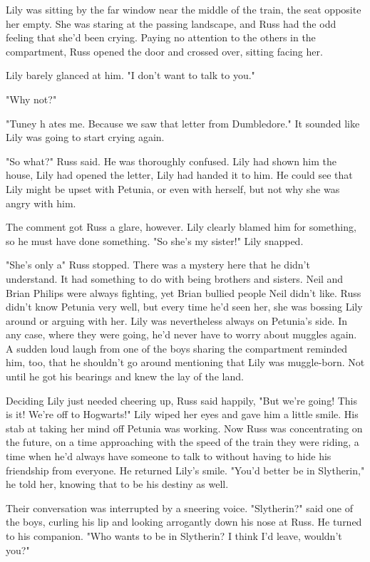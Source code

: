 Lily was sitting by the far window near the middle of the train, the seat opposite her empty. She was staring at the passing landscape, and Russ had the odd feeling that she'd been crying. Paying no attention to the others in the compartment, Russ opened the door and crossed over, sitting facing her.

Lily barely glanced at him. "I don't want to talk to you."

"Why not?"

"Tuney h{\el} ates me. Because we saw that letter from Dumbledore." It sounded like Lily was going to start crying again.

"So what?" Russ said. He was thoroughly confused. Lily had shown him the house, Lily had opened the letter, Lily had handed it to him. He could see that Lily might be upset with Petunia, or even with herself, but not why she was angry with him.

The comment got Russ a glare, however. Lily clearly blamed him for something, so he must have done something. "So she's my sister!" Lily snapped.

"She's only a{\el}" Russ stopped. There was a mystery here that he didn't understand. It had something to do with being brothers and sisters. Neil and Brian Philips were always fighting, yet Brian bullied people Neil didn't like. Russ didn't know Petunia very well, but every time he'd seen her, she was bossing Lily around or arguing with her. Lily was nevertheless always on Petunia's side. In any case, where they were going, he'd never have to worry about muggles again. A sudden loud laugh from one of the boys sharing the compartment reminded him, too, that he shouldn't go around mentioning that Lily was muggle-born. Not until he got his bearings and knew the lay of the land.

Deciding Lily just needed cheering up, Russ said happily, "But we're going! This is it! We're off to Hogwarts!" Lily wiped her eyes and gave him a little smile. His stab at taking her mind off Petunia was working. Now Russ was concentrating on the future, on a time approaching with the speed of the train they were riding, a time when he'd always have someone to talk to without having to hide his friendship from everyone. He returned Lily's smile. "You'd better be in Slytherin," he told her, knowing that to be his destiny as well.

Their conversation was interrupted by a sneering voice. "Slytherin?" said one of the boys, curling his lip and looking arrogantly down his nose at Russ. He turned to his companion. "Who wants to be in Slytherin? I think I'd leave, wouldn't you?"

